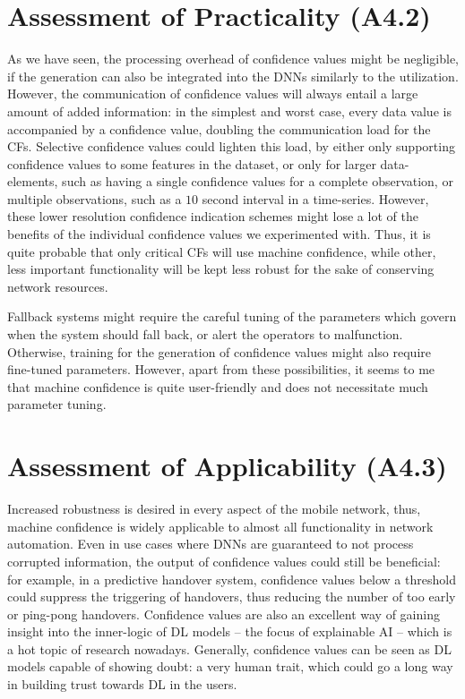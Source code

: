 	\section{Assessment of Practicality (A4.2)}
	
		As we have seen, the processing overhead of confidence values might be negligible, if the generation can also be integrated into the \acp{DNN} similarly to the utilization.
		However, the communication of confidence values will always entail a large amount of added information: in the simplest and worst case, every data value is accompanied by a confidence value, doubling the communication load for the \acp{CF}.
		Selective confidence values could lighten this load, by either only supporting confidence values to some features in the dataset, or only for larger data-elements, such as having a single confidence values for a complete observation, or multiple observations, such as a $10$ second interval in a time-series.
		However, these lower resolution confidence indication schemes might lose a lot of the benefits of the individual confidence values we experimented with.
		Thus, it is quite probable that only critical \acp{CF} will use machine confidence, while other, less important functionality will be kept less robust for the sake of conserving network resources. 
		
		Fallback systems might require the careful tuning of the parameters which govern when the system should fall back, or alert the operators to malfunction.
		Otherwise, training for the generation of confidence values might also require fine-tuned parameters.
		However, apart from these possibilities, it seems to me that machine confidence is quite user-friendly and does not necessitate much parameter tuning.
		
	\section{Assessment of Applicability (A4.3)}
	
		Increased robustness is desired in every aspect of the mobile network, thus, machine confidence is widely applicable to almost all functionality in network automation.
		Even in use cases where \acp{DNN} are guaranteed to not process corrupted information, the output of confidence values could still be beneficial: for example, in a predictive handover system, confidence values below a threshold could suppress the triggering of handovers, thus reducing the number of too early or ping-pong handovers.
		Confidence values are also an excellent way of gaining insight into the inner-logic of \ac{DL} models -- the focus of explainable \ac{AI} -- which is a hot topic of research nowadays.
		Generally, confidence values can be seen as \ac{DL} models capable of showing doubt: a very human trait, which could go a long way in building trust towards \ac{DL} in the users.
	